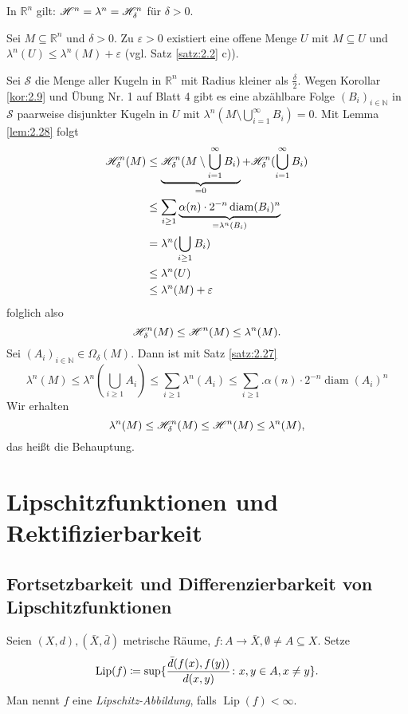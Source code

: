 \documentclass[a4paper,twoside,DIV15,BCOR12mm]{scrbook}
\newcommand{\HM}{\H}
\DeclareMathOperator{\diam}{diam}
\DeclareMathOperator{\Lip}{Lip}
\begin{document}
\begin{satz}
In \(\mathbb R^n\) gilt: \(\HM^n = \lambda^n = \HM^n_\delta\) für \(\delta > 0\).
\end{satz}
\begin{beweis}
Sei \(M \subseteq \mathbb R^n\) und $\delta>0$. Zu \(\varepsilon > 0\) existiert eine offene Menge \(U\) mit \(M \subseteq U\) und \(\lambda^n(U) \leq \lambda^n(M) + \varepsilon\) (vgl. Satz \ref{satz:2.2} c)).
\par
Sei \(\mathcal S\) die Menge aller Kugeln in \(\mathbb R^n\) mit Radius kleiner als \(\frac{\delta}2\). Wegen Korollar \ref{kor:2.9} und Übung Nr. 1 auf Blatt 4 gibt es eine abzählbare Folge \((B_i)_{i\in\mathbb N}\) in \(\mathcal S\) paarweise disjunkter Kugeln in \(U\) mit \(\lambda^n(M \setminus \bigcup_{i=1}^\infty B_i) = 0\). Mit Lemma \ref{lem:2.28} folgt
\begin{align*}
\HM^n_\delta(M) &\leq \underbrace{\HM^n_\delta(M\setminus \bigcup_{i=1}^\infty B_i)}_{=0} + \HM^n_\delta(\bigcup_{i=1}^\infty B_i) \\
&\leq \sum_{i\geq1} \underbrace{ \alpha(n) \cdot 2^{-n} \diam(B_i)^n }_{= \lambda^n(B_i)} \\
&= \lambda^n(\bigcup_{i\geq1} B_i) \\
&\leq \lambda^n(U) \\
&\leq \lambda^n(M) + \varepsilon
\end{align*}
folglich also
\[
\HM^n_\delta(M) \leq \HM^n(M) \leq \lambda^n(M).
\]
Sei \((A_i)_{i\in\mathbb N} \in \Omega_\delta(M)\). Dann ist mit Satz \ref{satz:2.27}
\[
\lambda^n(M) \leq \lambda^n(\bigcup_{i\geq1} A_i) \leq \sum_{i\geq1} \lambda^n(A_i) \leq \sum_{i\geq1}. \alpha(n)\cdot 2^{-n} \diam(A_i)^n
\]
Wir erhalten
\[
\lambda^n(M) \leq \HM^n_\delta(M) \leq \HM^n(M) \leq \lambda^n(M),
\]
das heißt die Behauptung.
\end{beweis}

\chapter{Lipschitzfunktionen und Rektifizierbarkeit}

\section{Fortsetzbarkeit und Differenzierbarkeit von Lipschitzfunktionen}

\begin{definition}
Seien \((X,d), (\bar X,\bar d)\) metrische Räume, \(f: A\rightarrow \bar X, \emptyset \neq A \subseteq X\). 
Setze
\[
\Lip(f) \da \sup \{ \frac{\bar d(f(x),f(y))}{d(x,y)} \colon x,y \in A, x\neq y\}.
\]
Man nennt \(f\) eine \emph{Lipschitz-Abbildung}, falls \(\Lip(f) < \infty\).
\end{definition}
\end{document}
